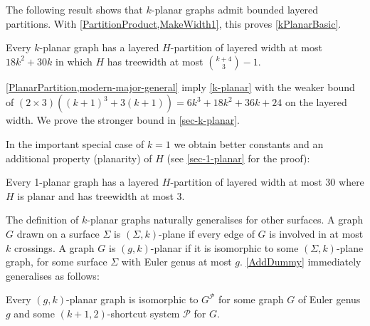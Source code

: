 \documentclass{patmorin}
\newcommand{\PP}{\mathcal{P}}
\renewcommand{\leq}{\leqslant}
\newcommand{\treewidth}{\ensuremath{\binom{k+4}{3}}-1}
\begin{document}
The following result shows that $k$-planar graphs admit bounded layered partitions. With \cref{PartitionProduct,MakeWidth1}, this proves \cref{kPlanarBasic}. %

\begin{thm}
\label{k-planar}
Every $k$-planar graph has a layered $H$-partition of layered width at most $18k^2 + 30k$ in which $H$ has treewidth at most $\binom{k+4}{3}-1$. %
\end{thm}

\cref{PlanarPartition,modern-major-general} imply \cref{k-planar} with the weaker bound of $(2\times 3)((k+1)^3+3(k+1))=6k^3 + 18k^2 + 36k+24$ on the layered width. We prove the stronger bound in \cref{sec-k-planar}. 

In the important special case of $k=1$ we obtain better constants and an additional property (planarity) of $H$ (see \cref{sec-1-planar} for the proof):

\begin{thm}
\label{1-planar}
Every 1-planar graph has a layered $H$-partition of layered width at most 30 where $H$ is planar and has treewidth at most 3.
\end{thm}


The definition of $k$-planar graphs naturally generalises for other surfaces. A graph $G$ drawn on a surface $\Sigma$ is $(\Sigma,k)$-plane if every edge of $G$ is involved in at most $k$ crossings.  A graph $G$ is $(g,k)$-planar if it is isomorphic to some $(\Sigma,k)$-plane graph, for some surface $\Sigma$ with Euler genus at most $g$. 
\cref{AddDummy} immediately generalises as follows:

\begin{obs}
\label{gAddDummy}
Every $(g,k)$-planar graph is isomorphic to $G^\PP$ for some graph $G$ of Euler genus $g$ and some $(k+1,2)$-shortcut system $\PP$ for $G$. 
\end{obs}
\end{document}
